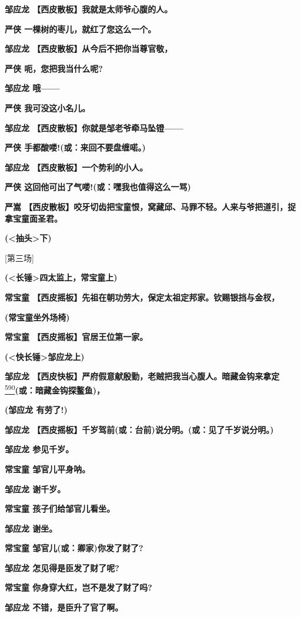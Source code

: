\textbf{邹应龙 【西皮散板】我就是太师爷心腹的人。}

\textbf{严侠 一棵树的枣儿，就红了您这么一个。}

\textbf{邹应龙 【西皮散板】从今后不把你当尊官敬，}

\textbf{严侠 呃，您把我当什么呢?}

\textbf{邹应龙 哦------}

\textbf{严侠 我可没这小名儿。}

\textbf{邹应龙 【西皮散板】你就是邹老爷牵马坠镫------}

\textbf{严侠 手都酸喽!(或：来回不要盘缠喏。)}

\textbf{邹应龙 【西皮散板】一个势利的小人。}

\textbf{严侠 这回他可出了气喽!(或：嘿我也值得这么一骂)}

\textbf{严嵩
【西皮散板】咬牙切齿把宝童恨，窝藏邱、马罪不轻。人来与爷把道引，捉拿宝童面圣君。}

\textbf{(\textless{}抽头\textgreater{}下)}

{[}第三场{]}

\textbf{(\textless{}长锤\textgreater{}四太监上，常宝童上)}

\textbf{常宝童
【西皮摇板】先祖在朝功劳大，保定太祖定邦家。钦赐银挡与金杈，}

\textbf{(常宝童坐外场椅)}

\textbf{常宝童 【西皮摇板】官居王位第一家。}

\textbf{(\textless{}快长锤\textgreater{}邹应龙上)}

\textbf{邹应龙
【西皮快板】严府假意献殷勤，老贼把我当心腹人。暗藏金钩来拿定}\protect\hyperlink{fn590}{\textsuperscript{590}}\textbf{(或：暗藏金钩探鳌鱼)，}

\textbf{(邹应龙 有劳了!)}

\textbf{邹应龙
【西皮摇板】千岁驾前(或：台前)说分明。(或：见了千岁说分明。)}

\textbf{邹应龙 参见千岁。}

\textbf{常宝童 邹官儿平身呐。}

\textbf{邹应龙 谢千岁。}

\textbf{常宝童 孩子们给邹官儿看坐。}

\textbf{邹应龙 谢坐。}

\textbf{常宝童 邹官儿(或：卿家)你发了财了?}

\textbf{邹应龙 怎见得是臣发了财了呢?}

\textbf{常宝童 你身穿大红，岂不是发了财了吗?}

\textbf{邹应龙 不错，是臣升了官了啊。}

